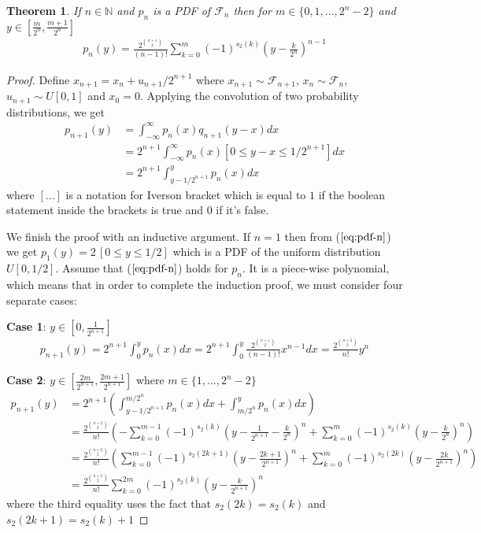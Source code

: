\documentclass{article}
\newtheorem{theorem}{Theorem}
\begin{document}
\begin{theorem}
\label{theorem:pn}
If $n \in \mathbb{N}$  and $p_n$ is a PDF of $\mathcal{F}_n$ then for $m \in \{0, 1, ..., 2^{n}-2\}$ and $y \in \left[\frac{m}{2^{n}}, \frac{m+1}{2^{n}}\right]$
\begin{align}
p_n(y)
=
  \frac{2^{\binom{n+1}{2}}}{(n-1)!}
  \sum_{k=0}^{m}
    (-1)^{s_2(k)}
    \left(y - \frac{k}{2^n}\right)^{n-1}
    \label{eq:pdf-n} 
\end{align}
\end{theorem}
\begin{proof}
Define $x_{n+1} = x_n + u_{n+1}/2^{n+1}$ where $x_{n+1} \sim \mathcal{F}_{n+1}$, $x_{n} \sim \mathcal{F}_{n}$, $u_{n+1} \sim U[0,1]$ and $x_0 = 0$. Applying the convolution of two probability distributions, we get
\begin{align*}
p_{n+1}(y) &= \int_{-\infty}^{\infty} p_n(x) q_{n+1}(y-x) dx \\
           &=  2^{n+1} \int_{-\infty}^{\infty} p_n(x) \left[0 \le y-x \le 1/2^{n+1}\right] dx \\
           &= 2^{n+1} \int_{y-1/2^{n+1}}^{y} p_n(x) dx
\end{align*}
where $[...]$ is a notation for Iverson bracket which is equal to $1$ if the boolean statement inside the brackets is true and $0$ if it's false.

We finish the proof with an inductive argument. If $n=1$ then from ($\ref{eq:pdf-n}$) we get $p_1(y)=2\,[0 \le y \le 1/2]$  which is a PDF of the uniform distribution $U[0, 1/2]$. Assume that ($\ref{eq:pdf-n}$) holds for $p_n$. It is a piece-wise polynomial, which means that in order to complete the induction proof, we must consider four separate cases:

\textbf{Case 1}: $y \in \left[0, \frac{1}{2^{n+1}}\right]$
\begin{align*}
p_{n+1}(y) = 2^{n+1} \int_{0}^{y} p_n(x) dx
           = 2^{n+1} \int_{0}^{y}\frac{2^{\binom{n+1}{2}}}{(n-1)!}x^{n-1} dx
           = \frac{2^{\binom{n+2}{2}}}{n!} y^n
\end{align*}

\textbf{Case 2}: $y \in \left[\frac{2m}{2^{n+1}}, \frac{2m+1}{2^{n+1}}\right]$ where $m \in \{1, ..., 2^n-2\}$
\begin{align*}
p_{n+1}(y) 
    &= 2^{n+1}
        \left(\int_{y-1/2^{n+1}}^{m/2^n} p_n(x) dx 
        + \int_{m/2^n}^{y} p_n(x) dx\right) \\
    &= 
        \frac{2^{\binom{n+2}{2}}}{n!}
        \left(
            -\sum_{k=0}^{m-1} (-1)^{s_2(k)}\left(y-\frac{1}{2^{n+1}}-\frac{k}{2^{n}}\right)^n
            + \sum_{k=0}^{m} (-1)^{s_2(k)}\left(y-\frac{k}{2^{n}}\right)^n \right) \\
    &= 
        \frac{2^{\binom{n+2}{2}}}{n!}\left(\sum_{k=0}^{m-1} (-1)^{s_2(2k+1)}\left(y-\frac{2k+1}{2^{n+1}}\right)^n
        +\sum_{k=0}^{m} (-1)^{s_2(2k)}\left(y-\frac{2k}{2^{n+1}}\right)^n \right)\\
    &= 
        \frac{2^{\binom{n+2}{2}}}{n!}\sum_{k=0}^{2m} (-1)^{s_2(k)}\left(y-\frac{k}{2^{n+1}}\right)^n 
\end{align*}
where the third equality uses the fact that $s_2(2k) = s_2(k)$ and $s_2(2k+1) = s_2(k)+1$


\end{proof}
\end{document}

